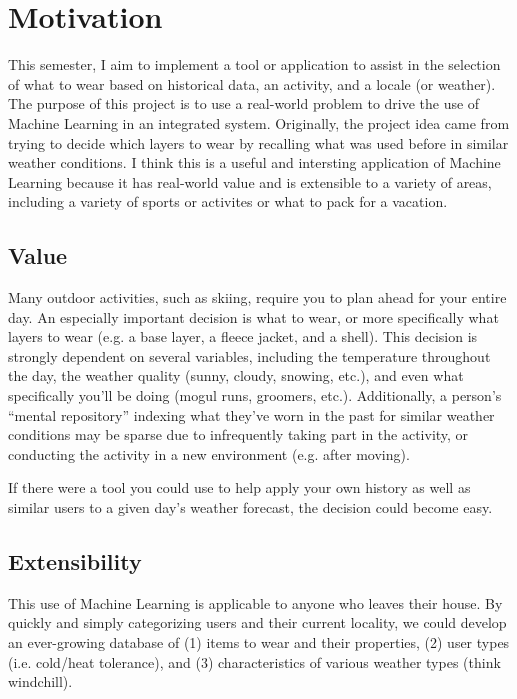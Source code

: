 \section{Motivation}
\label{section:motivation}
This semester, I aim to implement a tool or application to assist in the selection of what to wear based on
historical data, an activity, and a locale (or weather). The purpose of this project is to use a real-world
problem to drive the use of Machine Learning in an integrated system. Originally, the project idea came from trying
to decide which layers to wear by recalling what was used before in similar weather conditions. I think this is a
useful and intersting application of Machine Learning because it has real-world value and is extensible to a variety
of areas, including a variety of sports or activites or what to pack for a vacation.

\subsection{Value}
Many outdoor activities, such as skiing, require you to plan ahead for your entire day. An especially important
decision is what to wear, or more specifically what layers to wear (e.g. a base layer, a fleece jacket, and a shell).
This decision is strongly dependent on several variables, including the temperature throughout the day, the weather
quality (sunny, cloudy, snowing, etc.), and even what specifically you'll be doing (mogul runs, groomers, etc.).
Additionally, a person's ``mental repository'' indexing what they've worn in the past for similar weather conditions
may be sparse due to infrequently taking part in the activity, or conducting the activity in a new environment (e.g.
after moving).

If there were a tool you could use to help apply your own history as well as similar users to a given day's weather
forecast, the decision could become easy.

\subsection{Extensibility}
This use of Machine Learning is applicable to anyone who leaves their house. By quickly and simply categorizing
users and their current locality, we could develop an ever-growing database of (1) items to wear and their properties,
(2) user types (i.e. cold/heat tolerance), and (3) characteristics of various weather types (think windchill).